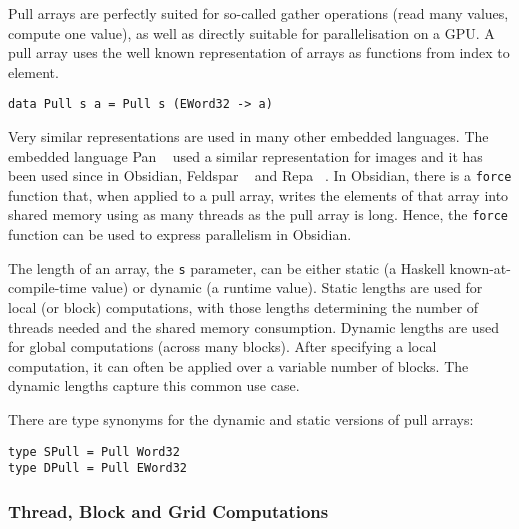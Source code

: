 Pull arrays are perfectly suited for so-called gather operations (read 
many values, compute one value), as well as directly suitable for parallelisation 
on a GPU. A pull array uses the well known representation of arrays as 
functions from index to element. 

\begin{small} 
\begin{verbatim} 
data Pull s a = Pull s (EWord32 -> a) 
\end{verbatim} 
\end{small}

Very similar representations are used 
in many other embedded languages. The 
embedded language Pan ~\cite{COMPILEEDSL} used a similar representation for 
images and it has been used since in Obsidian, Feldspar ~\cite{FELDSPAR} 
and Repa ~\cite{REPA}. In Obsidian, there is a {\tt force} function that,
when applied to a pull array, writes the elements of that array 
into shared memory using as many threads as the pull array is long. Hence, 
the {\tt force} function can be used to express parallelism in Obsidian. 


The length of an array, the {\tt s} parameter,
can be either static (a Haskell known-at-compile-time value) or dynamic 
(a runtime value). Static lengths are used for local (or block) 
computations, with those lengths determining the number of threads needed and the shared memory consumption. Dynamic 
lengths are used for global computations (across many blocks). After specifying 
a local computation, it can often be applied over a variable number of blocks. 
The dynamic lengths capture this common use case.

There are type synonyms for the dynamic and static versions of  pull arrays: 

\begin{small}
\begin{verbatim}
type SPull = Pull Word32 
type DPull = Pull EWord32 
\end{verbatim}
\end{small} 

\subsubsection{Thread, Block and Grid Computations} 
\label{sec:Program}

